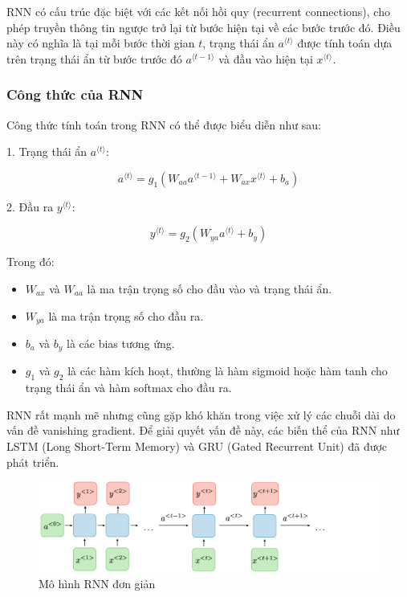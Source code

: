 \documentclass[conference]{IEEEtran}
\begin{document}
RNN có cấu trúc đặc biệt với các kết nối hồi quy (recurrent connections), cho phép truyền thông tin ngược trở lại từ bước hiện tại về các bước trước đó. Điều này có nghĩa là tại mỗi bước thời gian \(t\), trạng thái ẩn \(a^{\langle t \rangle}\) được tính toán dựa trên trạng thái ẩn từ bước trước đó \(a^{\langle t-1 \rangle}\) và đầu vào hiện tại \(x^{\langle t \rangle}\).

\subsubsection{Công thức của RNN}

Công thức tính toán trong RNN có thể được biểu diễn như sau:

1. Trạng thái ẩn \(a^{\langle t \rangle}\):

\[
a^{\langle t \rangle} = g_1 \left( W_{aa} a^{\langle t-1 \rangle} + W_{ax} x^{\langle t \rangle} + b_a \right)
\]

2. Đầu ra \(y^{\langle t \rangle}\):

\[
y^{\langle t \rangle} = g_2 \left( W_{ya} a^{\langle t \rangle} + b_y \right)
\]

Trong đó:
\begin{itemize}
    \item \(W_{ax}\) và \(W_{aa}\) là ma trận trọng số cho đầu vào và trạng thái ẩn.
    \item \(W_{ya}\) là ma trận trọng số cho đầu ra.
    \item \(b_a\) và \(b_y\) là các bias tương ứng.
    \item \(g_1\) và \(g_2\) là các hàm kích hoạt, thường là hàm sigmoid hoặc hàm tanh cho trạng thái ẩn và hàm softmax cho đầu ra.
\end{itemize}

RNN rất mạnh mẽ nhưng cũng gặp khó khăn trong việc xử lý các chuỗi dài do vấn đề vanishing gradient. Để giải quyết vấn đề này, các biến thể của RNN như LSTM (Long Short-Term Memory) và GRU (Gated Recurrent Unit) đã được phát triển.

\begin{figure}
    \centering
    \includegraphics[width=0.5\linewidth]{image.png}
    \caption{Mô hình RNN đơn giản}
    \label{fig:rnn}
\end{figure}
\end{document}
